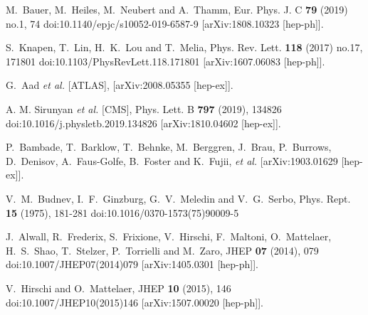 \begin{thebibliography}{1}
    M.~Bauer, M.~Heiles, M.~Neubert and A.~Thamm,
    Eur. Phys. J. C \textbf{79} (2019) no.1, 74
    doi:10.1140/epjc/s10052-019-6587-9
    [arXiv:1808.10323 [hep-ph]].
    
    S.~Knapen, T.~Lin, H.~K.~Lou and T.~Melia,
    Phys. Rev. Lett. \textbf{118} (2017) no.17, 171801
    doi:10.1103/PhysRevLett.118.171801
    [arXiv:1607.06083 [hep-ph]].
    
    G.~Aad \textit{et al.} [ATLAS], [arXiv:2008.05355 [hep-ex]].
    
    A. M. Sirunyan \textit{et al.} [CMS],
    Phys. Lett. B \textbf{797} (2019), 134826
    doi:10.1016/j.physletb.2019.134826
    [arXiv:1810.04602 [hep-ex]].
    
    P.~Bambade, T.~Barklow, T.~Behnke, M.~Berggren, J.~Brau, P.~Burrows, D.~Denisov, A.~Faus-Golfe, B.~Foster and K.~Fujii, \textit{et al.}
    [arXiv:1903.01629 [hep-ex]].
    
    V.~M.~Budnev, I.~F.~Ginzburg, G.~V.~Meledin and V.~G.~Serbo,
    Phys. Rept. \textbf{15} (1975), 181-281
    doi:10.1016/0370-1573(75)90009-5
    
    J.~Alwall, R.~Frederix, S.~Frixione, V.~Hirschi, F.~Maltoni, O.~Mattelaer, H.~S.~Shao, T.~Stelzer, P.~Torrielli and M.~Zaro,
    JHEP \textbf{07} (2014), 079
    doi:10.1007/JHEP07(2014)079
    [arXiv:1405.0301 [hep-ph]].
    
    V.~Hirschi and O.~Mattelaer,
    JHEP \textbf{10} (2015), 146
    doi:10.1007/JHEP10(2015)146
    [arXiv:1507.00020 [hep-ph]].
    

\end{thebibliography}
